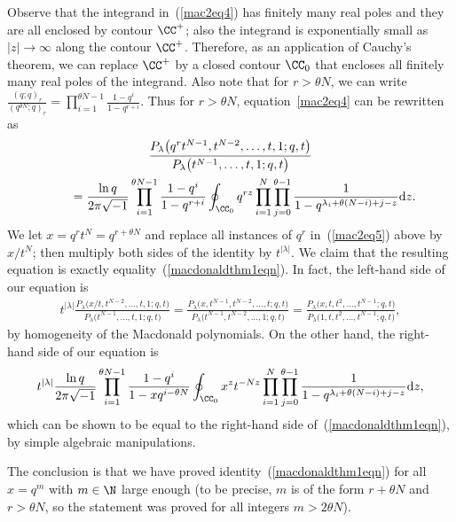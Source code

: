 Observe that the integrand in~(\ref{mac2eq4}) has f\/initely many real poles and they are all enclosed by contour $\CC^+$; also the integrand is exponentially small as $|z|\rightarrow\infty$ along the contour $\CC^+$. Therefore, as an application of Cauchy's theorem, we can replace $\CC^+$ by a closed contour $\CC_0$ that encloses all f\/initely many real poles of the integrand. Also note that for $r > \theta N$, we can write $\frac{(q; q)_r}{(q^{\theta N}; q)_r} = \prod\limits_{i=1}^{\theta N - 1}{\frac{1 - q^i}{1 - q^{r+i}}}$. Thus for $r > \theta N$, equation~\eqref{mac2eq4} can be rewritten as
\begin{gather}
\frac{P_{\lambda}\big(q^rt^{N-1}, t^{N-2}, \dots, t, 1; q, t\big)}{P_{\lambda}\big(t^{N-1}, \dots, t, 1; q, t\big)}\nonumber\\
 \qquad{} = \frac{\ln{q}}{2\pi\sqrt{-1}} \prod_{i=1}^{\theta N - 1}{\frac{1 - q^i}{1 - q^{r+i}}}\oint_{\CC_0}{q^{rz}\prod_{i=1}^N{\prod_{j=0}^{\theta - 1}{\frac{1}{1 - q^{\lambda_i + \theta(N - i) + j - z}}}{\rm d}z}}.
\label{mac2eq5}\end{gather}
We let $x = q^r t^N = q^{r + \theta N}$ and replace all instances of $q^r$ in~(\ref{mac2eq5}) above by $x/t^N$; then multiply both sides of the identity by $t^{|\lambda|}$. We claim that the resulting equation is exactly equality~(\ref{macdonaldthm1eqn}). In fact, the left-hand side of our equation is
\begin{gather*}
t^{|\lambda|}\frac{P_{\lambda}\big(x/t, t^{N-2}, \dots, t, 1; q, t\big)}{P_{\lambda}\big(t^{N-1}, \dots, t, 1; q, t\big)} = \frac{P_{\lambda}\big(x, t^{N-1}, t^{N-2}, \dots, t; q, t\big)}{P_{\lambda}\big(t^{N-1}, t^{N-2}, \dots, 1; q, t\big)} = \frac{P_{\lambda}\big(x, t, t^2, \dots, t^{N-1}; q, t\big)}{P_{\lambda}\big(1, t, t^2, \dots, t^{N-1}; q, t\big)},
\end{gather*}
by homogeneity of the Macdonald polynomials. On the other hand, the right-hand side of our equation is
\begin{gather*}
t^{|\lambda|}\frac{\ln{q}}{2\pi\sqrt{-1}} \prod_{i=1}^{\theta N - 1}{\frac{1 - q^i}{1 - xq^{i - \theta N}}}\oint_{\CC_0}{x^z t^{-Nz}\prod_{i=1}^N{\prod_{j=0}^{\theta - 1}{\frac{1}{1 - q^{\lambda_i + \theta(N - i) + j - z}}}{\rm d}z}},
\end{gather*}
which can be shown to be equal to the right-hand side of~(\ref{macdonaldthm1eqn}), by simple algebraic manipulations.

The conclusion is that we have proved identity~(\ref{macdonaldthm1eqn}) for all $x = q^m$ with $m\in\N$ large enough (to be precise, $m$ is of the form $r + \theta N$ and $r > \theta N$, so the statement was proved for all integers $m > 2\theta N$).

